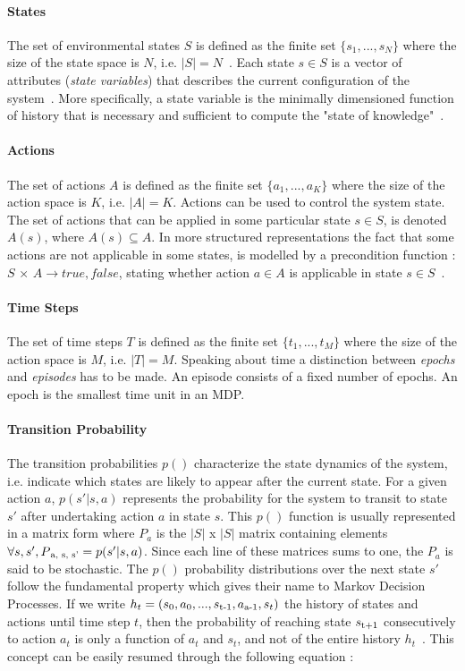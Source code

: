 \paragraph{States} The set of environmental states $S$ is defined as the finite set $\{s_1, . . . , s_N\}$ where the size of the state space is $N$, i.e. $|S| = N$~\cite{wiering2012reinforcement}. Each state ${s \in S}$ is a vector of attributes (\textit{state variables}) that describes the current configuration of the system~\cite{Nevmyvaka}. More specifically, a state variable is the minimally dimensioned function of history that is necessary and sufficient to compute the "state of knowledge"~\cite{Powell}.

\paragraph{Actions} The set of actions $A$ is defined as the finite set $\{a_1, . . . ,a_K\}$ where the size of the action space is $K$, i.e. $|A| = K$. Actions can be used to control the system state. The set of actions that can be applied in some particular state $s \in S$, is denoted $A(s)$, where $A(s) \subseteq A$. In more structured representations the fact that some actions are not applicable in some states, is modelled by a precondition function : $S$ × $A→{true,false}$, stating whether action $a \in A$ is applicable in state $s \in S$~\cite{wiering2012reinforcement}.

\paragraph{Time Steps} The set of time steps $T$ is defined as the finite set $\{t_1, . . . ,t_M\}$ where the size of the action space is $M$, i.e. $|T| = M$. Speaking about time a distinction between \textit{epochs} and \textit{episodes} has to be made. An episode consists of a fixed number of epochs. An epoch is the smallest time unit in an MDP.

\paragraph{Transition Probability} The transition probabilities $p()$ characterize the state dynamics of the system, i.e. indicate which states are likely to appear after the current state. For a given action $a$, $p(s'|s,a)$ represents the probability for the system to transit to state $s'$ after undertaking action $a$ in state $s$. This $p()$ function is usually represented in a matrix form where $P_a$ is the $|S|$ x $|S|$ matrix containing elements $\forall s, s', P\textsubscript{a, s, s'} = p(s'|s,a)$. Since each line of these matrices sums to one, the $P_a$ is said to be stochastic. The $p()$ probability distributions over the next state $s'$ follow the fundamental property which gives their name to Markov Decision Processes. If we write $h_t = (s_0, a_0, ..., s\textsubscript{t-1}, a\textsubscript{a-1}, s_t)$ the history of states and actions until time step $t$, then the probability of reaching state $s\textsubscript{t+1}$ consecutively to action $a_t$ is only a function of $a_t$ and $s_t$, and not of the entire history $h_t$~\cite{Sigaud:2010:MDP:1841781}. This concept can be easily resumed through the following equation :

